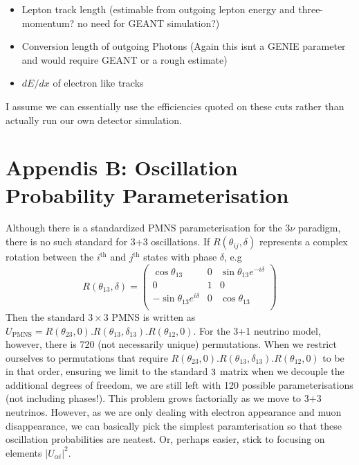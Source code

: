 \documentclass[12pt, a4paper]{article}
\begin{document}
\begin{itemize}
	\item Lepton track length (estimable from outgoing lepton energy and three-momentum? no need for GEANT simulation?)
	\item Conversion length of outgoing Photons (Again this isnt a GENIE parameter and would require GEANT or a rough estimate)
	\item $dE/dx$ of electron like tracks
\end{itemize}
I assume we can essentially use the efficiencies quoted on these cuts rather than actually run our own detector simulation. 

\section{Appendis B: Oscillation Probability Parameterisation}
Although there is a standardized PMNS parameterisation for the 3$\nu$ paradigm, there is no such standard for 3+3 oscillations. If $R(\theta_{ij},\delta)$ represents a complex rotation between the $i^\text{th}$ and $j^\text{th}$ states with phase $\delta$, e.g
\begin{equation*}
	R(\theta_{13},\delta)  = 
	\begin{pmatrix} 
		\cos \theta_{13} & 0 & \sin \theta_{13} e^{-i \delta} \\
		0 & 1 & 0 \\
		-\sin \theta_{13} e^{i \delta} & 0 & \cos \theta_{13} \\
	\end{pmatrix}
\end{equation*}
Then the standard $3\times3$ PMNS is written as $U_\text{PMNS}= R(\theta_{23},0).R(\theta_{13},\delta_{13}).R(\theta_{12},0)$. For the 3+1 neutrino model, however, there is 720 (not necessarily unique) permutations. When we restrict ourselves to permutations that require  $R(\theta_{23},0).R(\theta_{13},\delta_{13}).R(\theta_{12},0)$ to be in that order, ensuring we limit to the standard $3\time3$ matrix when we decouple the additional degrees of freedom, we are still left with 120 possible parameterisations (not including phases!). This problem grows factorially as we move to 3+3 neutrinos. However, as we are only dealing with electron appearance and muon disappearance, we can basically pick the simplest paramterisation so that these oscillation probabilities are neatest. Or, perhaps easier, stick to focusing on elements $\vert U_{\alpha i}\vert^2$.  

\end{document}
